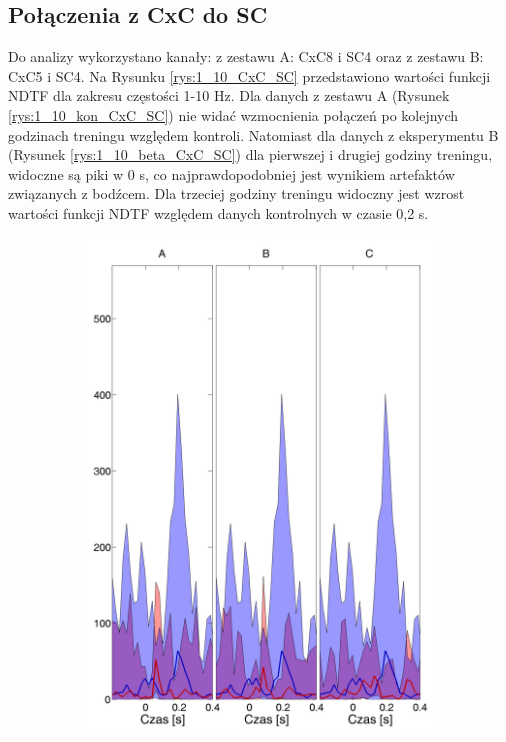 \documentclass{pracamgr}
\begin{document}
	\subsection{Połączenia z CxC do SC}
	Do analizy wykorzystano kanały: z zestawu A: CxC8 i SC4 oraz z zestawu B: CxC5 i SC4.
	Na Rysunku \ref{rys:1_10_CxC_SC} przedstawiono wartości funkcji NDTF dla zakresu częstości 1-10 Hz. Dla danych z zestawu A (Rysunek \ref{rys:1_10_kon_CxC_SC}) nie widać wzmocnienia połączeń po kolejnych godzinach treningu względem kontroli. Natomiast dla danych z eksperymentu B (Rysunek \ref{rys:1_10_beta_CxC_SC}) dla pierwszej i drugiej godziny treningu, widoczne są piki w 0 s, co najprawdopodobniej jest wynikiem artefaktów związanych z bodźcem. Dla trzeciej godziny treningu widoczny jest wzrost wartości funkcji NDTF względem danych kontrolnych w czasie 0,2 s.
	\begin{figure}[h]
		\begin{subfigure}{.5\textwidth}
			\centering
			\includegraphics[width=1.\linewidth]{kontrola15_1-10_z_CxC8_do_SC42.png}

\end{subfigure}
\end{figure}
\end{document}
